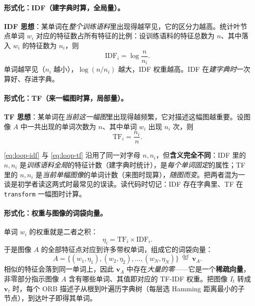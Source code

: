 \paragraph{形式化：IDF（建字典时算，全局量）。}
\textbf{IDF 思想}：某单词在\emph{整个训练语料}里出现得越罕见，它的区分力越高。统计叶节点单词 $w_i$ 对应的特征数占所有特征的比例：设训练语料的特征总数为 $n$、其中落入 $w_i$ 的特征数为 $n_i$，则
\begin{equation}
  \mathrm{IDF}_i = \log\frac{n}{n_i}.
  \label{eq:loop-idf}
\end{equation}
单词越罕见（$n_i$ 越小），$\log(n/n_i)$ 越大，IDF 权重越高\cite{gaoxiang2019slam14}。IDF 在\emph{建字典时}一次算好、存进字典。

\paragraph{形式化：TF（来一幅图时算，局部量）。}
\textbf{TF 思想}：某单词在\emph{当前这一幅图}里出现得越频繁，它对描述这幅图越重要。设图像 $A$ 中一共出现的单词次数为 $n$、其中单词 $w_i$ 出现 $n_i$ 次，则
\begin{equation}
  \mathrm{TF}_i = \frac{n_i}{n}.
  \label{eq:loop-tf}
\end{equation}

\begin{pitfall}
\cref{eq:loop-idf} 与 \cref{eq:loop-tf} 沿用了同一对字母 $n,n_i$，但\textbf{含义完全不同}\cite{gaoxiang2019slam14}：IDF 里的 $n,n_i$ 是\emph{训练语料全局}的特征计数（建字典时统计），是\emph{每个单词固定}的属性；TF 里的 $n,n_i$ 是\emph{当前单幅图像}的单词计数（来图时现算），\emph{随图而变}。把两者混为一谈是初学者读这两式时最常见的误读。读代码时切记：IDF 存在字典里、TF 在 \verb|transform| 一幅图时计算。
\end{pitfall}

\paragraph{形式化：权重与图像的词袋向量。}
单词 $w_i$ 的权重就是二者之积：
\begin{equation}
  \eta_i = \mathrm{TF}_i \times \mathrm{IDF}_i.
  \label{eq:loop-weight}
\end{equation}
于是图像 $A$ 的全部特征点对应到许多带权单词，组成它的词袋向量\cite{gaoxiang2019slam14}：
\begin{equation}
  A = \{(w_1,\eta_1),(w_2,\eta_2),\dots,(w_N,\eta_N)\}\ \stackrel{\mathrm{def}}{=}\ \boldsymbol v_A.
  \label{eq:loop-bowvec}
\end{equation}
相似的特征会落到同一单词上，因此 $\boldsymbol v_A$ 中存在\emph{大量的零}——它是一个\textbf{稀疏向量}，非零部分指示图像 $A$ 含有哪些单词、其值即对应的 TF-IDF 权重。把图像 $I_t$ 转成 $\boldsymbol v_t$ 时，每个 ORB 描述子从根到叶遍历字典树（每层选 Hamming 距离最小的子节点），到达叶子即得其单词\cite{galvez2012bags}。

